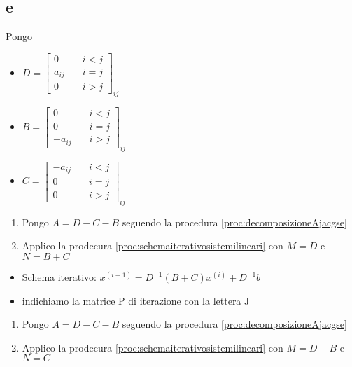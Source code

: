 \subsection{ e }
\begin{proc}[Decomposizione di A]\label{proc:decomposizioneAjacgse}
Pongo
\begin{itemize}
\item $ D = \left[ \begin{array}{ll}
0 & \quad i < j \\
a_{ij} & \quad i = j \\
0 & \quad i > j
\end{array} \right]_{ij} $
\item $ B = \left[ \begin{array}{ll}
0 & \quad i < j \\
0 & \quad i = j \\
-a_{ij} & \quad i > j
\end{array} \right]_{ij} $
\item $ C = \left[ \begin{array}{ll}
-a_{ij} & \quad i < j \\
0 & \quad i = j \\
0 & \quad i > j
\end{array} \right]_{ij} $
\end{itemize}
\end{proc}

\askip

\begin{proc}
\begin{enumerate}
\item Pongo $ A = D - C - B $ seguendo la procedura \ref{proc:decomposizioneAjacgse}
\item Applico la prodecura \ref{proc:schemaiterativosistemilineari} con $ M = D $ e $ N = B + C $
\end{enumerate}
\end{proc}

\askip

\begin{itemize}
\item Schema iterativo: $ x^{(i+1)} = D^{-1}(B+C)x^{(i)} + D^{-1}b $
\item indichiamo la matrice P di iterazione con la lettera J
\end{itemize}

\askip

\begin{proc}
\begin{enumerate}
\item Pongo $ A = D - C - B $ seguendo la procedura \ref{proc:decomposizioneAjacgse}
\item Applico la prodecura \ref{proc:schemaiterativosistemilineari} con $ M = D - B $ e $ N = C $
\end{enumerate}
\end{proc}

